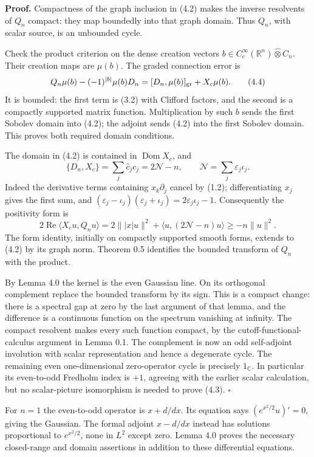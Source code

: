 \documentclass[
  11pt,
]{article}
\begin{document}
\textbf{Proof.} Compactness of the graph inclusion in (4.2) makes the
inverse resolvents of \(Q_n\) compact: they map boundedly into that
graph domain. Thus \(Q_n\), with scalar source, is an unbounded cycle.

Check the product criterion on the dense creation vectors
\(b\in C_c^\infty(\mathbb R^n)\widehat\otimes C_n\). Their creation maps
are \(\mu(b)\). The graded connection error is \[
Q_n\mu(b)-(-1)^{|b|}\mu(b)D_n
=[D_n,\mu(b)]_{\rm gr}+X_c\mu(b).
\tag{4.4}
\] It is bounded: the first term is (3.2) with Clifford factors, and the
second is a compactly supported matrix function. Multiplication by such
\(b\) sends the first Sobolev domain into (4.2); the adjoint sends (4.2)
into the first Sobolev domain. This proves both required domain
conditions.

The domain in (4.2) is contained in \(\operatorname{Dom}X_c\), and \[
\{D_n,X_c\}=\sum_j\widehat c_jc_j=2\mathcal N-n,
\qquad
\mathcal N=\sum_j\varepsilon_j\iota_j .
\tag{4.5}
\] Indeed the derivative terms containing \(x_k\partial_j\) cancel by
(1.2); differentiating \(x_j\) gives the first sum, and
\((\varepsilon_j-\iota_j)(\varepsilon_j+\iota_j)=2\varepsilon_j\iota_j-1\).
Consequently the positivity form is \[
2\operatorname{Re}\langle X_cu,Q_nu\rangle
=2\||x|u\|^2+\langle u,(2\mathcal N-n)u\rangle
\geq-n\|u\|^2 .
\tag{4.6}
\] The form identity, initially on compactly supported smooth forms,
extends to (4.2) by its graph norm. Theorem 0.5 identifies the bounded
transform of \(Q_n\) with the product.

By Lemma 4.0 the kernel is the even Gaussian line. On its orthogonal
complement replace the bounded transform by its sign. This is a compact
change: there is a spectral gap at zero by the last argument of that
lemma, and the difference is a continuous function on the spectrum
vanishing at infinity. The compact resolvent makes every such function
compact, by the cutoff-functional-calculus argument in Lemma 0.1. The
complement is now an odd self-adjoint involution with scalar
representation and hence a degenerate cycle. The remaining even
one-dimensional zero-operator cycle is precisely \(1_{\mathbb C}\). In
particular its even-to-odd Fredholm index is \(+1\), agreeing with the
earlier scalar calculation, but no scalar-picture isomorphism is needed
to prove (4.3). \(\square\)

For \(n=1\) the even-to-odd operator is \(x+d/dx\). Its equation says
\((e^{x^2/2}u)'=0\), giving the Gaussian. The formal adjoint \(x-d/dx\)
instead has solutions proportional to \(e^{x^2/2}\), none in \(L^2\)
except zero. Lemma 4.0 proves the necessary closed-range and domain
assertions in addition to these differential equations.
\end{document}
